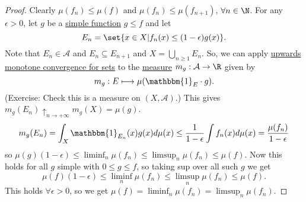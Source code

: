 \documentclass{article}
\newcommand{\1}[1]{\mathbbm{1}_{#1}}
\begin{document}

\begin{proof}
    Clearly $\mu(f_n) \leq \mu(f)$ and $\mu(f_n) \leq \mu(f_{n+1})$, $\forall n \in \N$.
    For any $\epsilon>0$, let $g$ be a \hyperlink{def:simpleFunc}{simple function} $g \leq f$ and let
    \begin{equation*}
        E_n = \set{x \in X | f_n(x) \leq (1 - \epsilon) g(x)}.
    \end{equation*}
    Note that $E_n \in \mathcal{A}$ and $E_n \subseteq E_{n+1}$ and $X =  \bigcup_{n \geq 1} E_n$.
    So, we can apply \hyperlink{def:monotoneConvForSets}{upwards monotone convergence for sets} to the \hyperlink{def:measure}{measure} $m_g: \mathcal{A} \to \R$ given by
    \begin{equation*}
        m_g: E \longmapsto \mu(\1{E} \cdot g).
    \end{equation*}
    (Exercise: Check this is a measure on $(X, \mathcal{A})$.)
    This gives $m_g(E_n) \uparrow_{n \to +\infty} m_g(X) = \mu(g)$.
    \begin{equation*}
        m_g(E_n) = \int_X \1{E_n}(x) g(x) d \mu(x) \leq \frac{1}{1-\epsilon} \int f_n(x) d\mu(x) = \frac{\mu(f_n)}{1-\epsilon}
    \end{equation*}
    so $\mu(g) (1-\epsilon) \leq \liminf_n \mu(f_n) \leq \limsup_n \mu(f_n) \leq \mu(f)$.
    Now this holds for all $g$ simple with $0 \leq g \leq f$, so taking sup over all such $g$ we get
    \begin{equation*}
        \mu(f) (1-\epsilon) \leq \liminf_n \mu(f_n) \leq \limsup_n \mu(f_n) \leq \mu(f).
    \end{equation*}
    This holds $\forall \epsilon > 0$, so we get $\mu(f) = \liminf_n \mu(f_n) = \limsup_n \mu(f_n)$.
\end{proof}
\end{document}
